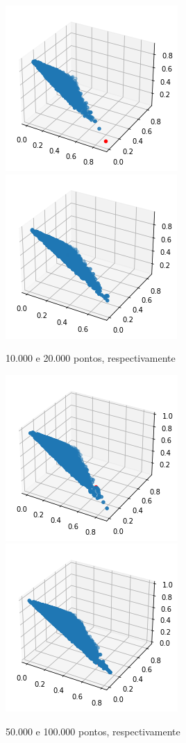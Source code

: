 \documentclass[12pt, a4paper]{article}
\begin{document}
\begin{figure}[H]
\centering

\includegraphics[scale = 0.7]{10K.png}
\includegraphics[scale = 0.7]{20K.png}
\caption{10.000 e 20.000 pontos, respectivamente}

\end{figure}

\begin{figure}[H]
\centering

\includegraphics[scale = 0.7]{50K.png}
\includegraphics[scale = 0.7]{100k.png}
\caption{50.000 e 100.000 pontos, respectivamente}

\end{figure}
\end{document}
